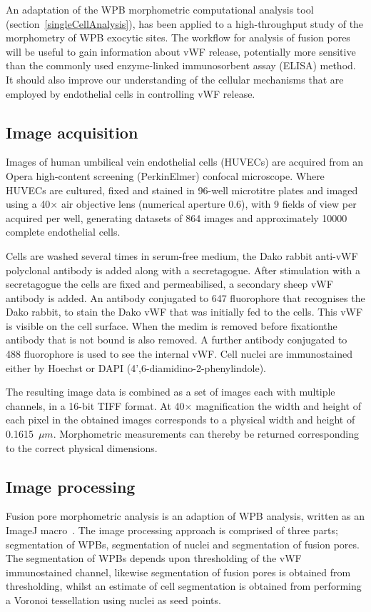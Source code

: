 An adaptation of the WPB morphometric computational analysis tool (section~\ref{singleCellAnalysis}), has been applied to a high-throughput study of the morphometry of WPB exocytic sites. The workflow for analysis of fusion pores will be useful to gain information about vWF release, potentially more sensitive than the commonly used enzyme-linked immunosorbent assay (ELISA) method. It should also improve our understanding of the cellular mechanisms that are employed by endothelial cells in controlling vWF release.

\subsection{Image acquisition}
Images of human umbilical vein endothelial cells (HUVECs) are acquired from an Opera high-content screening (PerkinElmer) confocal microscope. Where HUVECs are cultured, fixed and stained in 96-well microtitre plates and imaged using a 40$\times$ air objective lens (numerical aperture 0.6), with 9 fields of view per acquired per well, generating datasets of 864 images and approximately 10000 complete endothelial cells.

Cells are washed several times in serum-free medium, the Dako rabbit anti-vWF polyclonal antibody is added along with a secretagogue. After stimulation with a secretagogue the cells are fixed and permeabilised, a secondary sheep vWF antibody is added. An antibody conjugated to 647 fluorophore that recognises the Dako rabbit, to stain the Dako vWF that was initially fed to the cells. This vWF is visible on the cell surface. When the medim is removed before fixationthe antibody that is not bound is also removed. A further antibody conjugated to 488 fluorophore is used to see the internal vWF. Cell nuclei are immunostained either by Hoechst or DAPI (4',6-diamidino-2-phenylindole). 

The resulting image data is combined as a set of images each with multiple channels, in a 16-bit TIFF format. At 40$\times$ magnification the width and height of each pixel in the obtained images corresponds to a physical width and height of 0.1615~$\mu m$. Morphometric measurements can thereby be returned corresponding to the correct physical dimensions. 

\subsection{Image processing}
Fusion pore morphometric analysis is an adaption of WPB analysis, written as an ImageJ macro~\cite{Schneider2012}. The image processing approach is comprised of three parts; segmentation of WPBs, segmentation of nuclei and segmentation of fusion pores. The segmentation of WPBs depends upon thresholding of the vWF immunostained channel, likewise segmentation of fusion pores is obtained from thresholding, whilst an estimate of cell segmentation is obtained from performing a Voronoi tessellation using nuclei as seed points.

